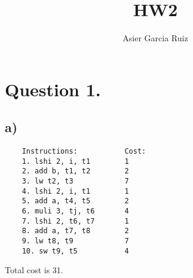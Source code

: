 \documentclass{article}
\title{HW2}
\author{Asier Garcia Ruiz}
\begin{document}
\maketitle

\section*{Question 1.}
\subsection*{a)}
\begin{verbatim}
    Instructions:           Cost:
    1. lshi 2, i, t1        1
    2. add b, t1, t2        2
    3. lw t2, t3            7
    4. lshi 2, i, t1        1
    5. add a, t4, t5        2
    6. muli 3, tj, t6       4
    7. lshi 2, t6, t7       1
    8. add a, t7, t8        2
    9. lw t8, t9            7
    10. sw t9, t5           4
\end{verbatim}

Total cost is 31.
\end{document}
